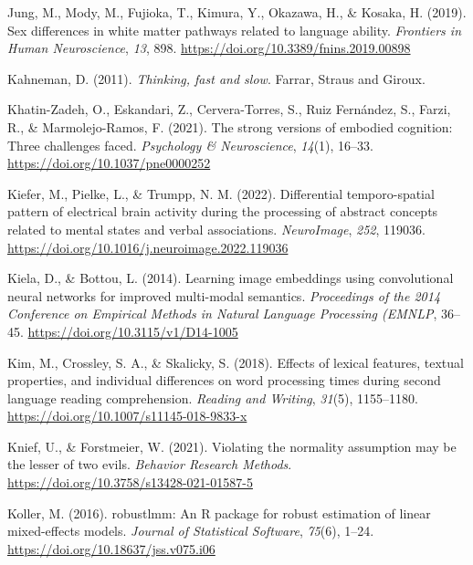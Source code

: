 \documentclass[
  12pt,
  man,floatsintext]{apa7}
\newlength{\cslhangindent}
\newlength{\cslentryspacingunit} %
\newenvironment{CSLReferences}[2] %
 {%
  \setlength{\parindent}{0pt}
  \ifodd #1
  \let\oldpar\par
  \def\par{\hangindent=\cslhangindent\oldpar}
  \fi
  \setlength{\parskip}{#2\cslentryspacingunit}
 }%
 {}
\begin{document}
\begin{CSLReferences}{1}{0}
\leavevmode{}%
Jung, M., Mody, M., Fujioka, T., Kimura, Y., Okazawa, H., \& Kosaka, H. (2019). Sex differences in white matter pathways related to language ability. \emph{Frontiers in Human Neuroscience}, \emph{13}, 898. \url{https://doi.org/10.3389/fnins.2019.00898}

\leavevmode{}%
Kahneman, D. (2011). \emph{Thinking, fast and slow}. {Farrar, Straus and Giroux}.

\leavevmode{}%
Khatin-Zadeh, O., Eskandari, Z., Cervera-Torres, S., Ruiz Fernández, S., Farzi, R., \& Marmolejo-Ramos, F. (2021). The strong versions of embodied cognition: {Three} challenges faced. \emph{Psychology \& Neuroscience}, \emph{14}(1), 16--33. \url{https://doi.org/10.1037/pne0000252}

\leavevmode{}%
Kiefer, M., Pielke, L., \& Trumpp, N. M. (2022). Differential temporo-spatial pattern of electrical brain activity during the processing of abstract concepts related to mental states and verbal associations. \emph{NeuroImage}, \emph{252}, 119036. \url{https://doi.org/10.1016/j.neuroimage.2022.119036}

\leavevmode{}%
Kiela, D., \& Bottou, L. (2014). Learning image embeddings using convolutional neural networks for improved multi-modal semantics. \emph{Proceedings of the 2014 Conference on Empirical Methods in Natural Language Processing ({EMNLP}}, 36--45. \url{https://doi.org/10.3115/v1/D14-1005}

\leavevmode{}%
Kim, M., Crossley, S. A., \& Skalicky, S. (2018). Effects of lexical features, textual properties, and individual differences on word processing times during second language reading comprehension. \emph{Reading and Writing}, \emph{31}(5), 1155--1180. \url{https://doi.org/10.1007/s11145-018-9833-x}

\leavevmode{}%
Knief, U., \& Forstmeier, W. (2021). Violating the normality assumption may be the lesser of two evils. \emph{Behavior Research Methods}. \url{https://doi.org/10.3758/s13428-021-01587-5}

\leavevmode{}%
Koller, M. (2016). {robustlmm}: An {R} package for robust estimation of linear mixed-effects models. \emph{Journal of Statistical Software}, \emph{75}(6), 1--24. \url{https://doi.org/10.18637/jss.v075.i06}


\end{CSLReferences}
\end{document}

